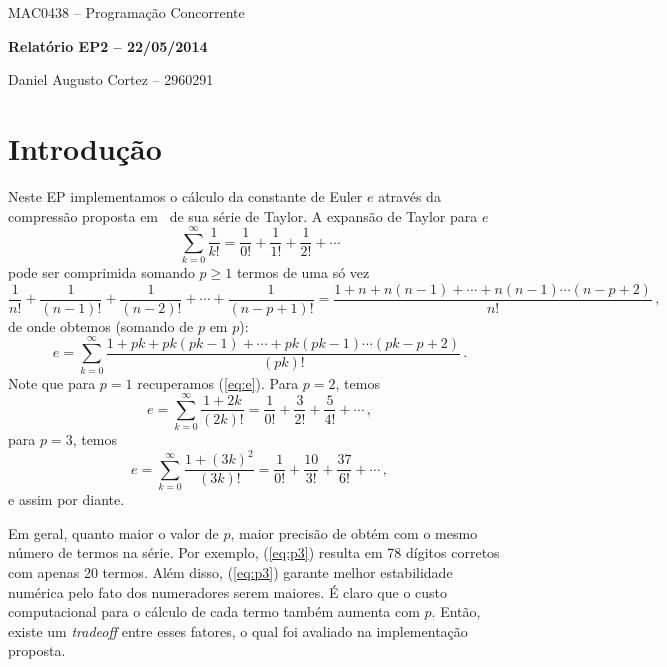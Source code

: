 \documentclass[12pt]{article}
\begin{document}
\begin{center}
{\large \sc MAC0438 -- Programação Concorrente}

\vspace{0.2cm}

{\large \bf Relatório EP2 -- 22/05/2014}

\vspace{0.5cm}

{\large Daniel Augusto Cortez -- 2960291}

\vspace{0.5cm}
\end{center}    


\section{Introdução}

Neste EP implementamos o cálculo da constante de Euler $e$ através da compressão proposta 
em~\cite{brothers04} de sua série de Taylor. A expansão de Taylor para $e$ 
%
\begin{equation} \label{eq:e}
	\sum_{k = 0}^{\infty} \frac{1}{k!} = \frac{1}{0!} + \frac{1}{1!} + \frac{1}{2!} + \cdots 
\end{equation}
%
pode ser comprimida somando $p \geq 1$ termos de uma só vez
%
\[
	\frac{1}{n!} + \frac{1}{(n - 1)!} + \frac{1}{(n - 2)!} + \cdots + \frac{1}{(n - p + 1)!} = 
	\frac{1 + n + n(n - 1) + \cdots + n(n - 1) \cdots (n - p + 2)}{n!} \, ,
\]
%
de onde obtemos (somando de $p$ em $p$):
%
\begin{equation} \label{eq:ec}
	e = \sum_{k = 0}^{\infty} 
		\frac{1 + pk + pk(pk - 1) + \cdots + pk(pk - 1) \cdots (pk - p + 2)}{(pk)!} \, . 
\end{equation}
%
Note que para $p = 1$ recuperamos (\ref{eq:e}). Para $p = 2$, temos
%
\[
	e = \sum_{k = 0}^{\infty} 
		\frac{1 + 2k}{(2k)!} = \frac{1}{0!} + \frac{3}{2!} + \frac{5}{4!} + \cdots \, , 
\]
%
para $p = 3$, temos
%
\begin{equation} \label{eq:p3}
	e = \sum_{k = 0}^{\infty} 
		\frac{1 + (3k)^2}{(3k)!} = \frac{1}{0!} + \frac{10}{3!} + \frac{37}{6!} + \cdots \, , 
\end{equation}
%
e assim por diante. 

Em geral, quanto maior o valor de $p$, maior precisão de obtém com o mesmo número de termos na 
série. Por exemplo, (\ref{eq:p3}) resulta em 78 dígitos corretos com apenas 20 termos.
Além disso, (\ref{eq:p3}) garante melhor estabilidade numérica pelo fato dos numeradores serem 
maiores. É claro que o custo computacional para o cálculo de cada termo também aumenta com $p$. 
Então, existe um {\it tradeoff} entre esses fatores, o qual foi avaliado na implementação proposta.
\end{document}
